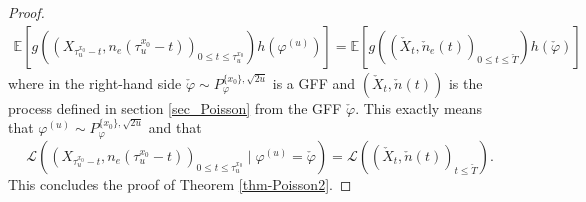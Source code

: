\documentclass[11pt,a4paper]{amsart}
\numberwithin{equation}{section}
\def\E{{\mathbb{E}}}
\def\lll{{\mathcal L}}
\begin{document}
\begin{proof}
\begin{eqnarray*}
\E\left[ g\left(\left(X_{\tau_u^{x_0}-t}, n_e(\tau_u^{x_0}-t)\right)_{0\le t\le \tau_u^{x_0}}\right)h(\varphi^{(u)})\right]=
\E\left[ g\left(\left(\check X_{t}, \check n_e(t)\right)_{0\le t\le \check T}\right)h(\check \varphi)\right]
\end{eqnarray*}
where in the right-hand side 
$\check \varphi\sim P_{\varphi}^{\{x_0\}, \sqrt{2u}} $ 
is a GFF and $(\check X_t, \check n(t))$ 
is the process defined in section \ref{sec_Poisson} from the
GFF $\check \varphi$.
This exactly means that 
$\varphi^{(u)} \sim P_{\varphi}^{\{x_0\}, \sqrt{2u}}$ 
and that
$$
\lll\left(\left(X_{\tau_u^{x_0}-t}, n_e(\tau_u^{x_0}-t)\right)_{0\le t\le \tau_u^{x_0}}\; 
\Big| \; \varphi^{(u)}=\check\varphi\right)= \lll\left(\left(\check X_t, \check n(t)\right)_{t\le \check T}\right).
$$
This concludes the proof of Theorem \ref{thm-Poisson2}.
\end{proof}
\end{document}
